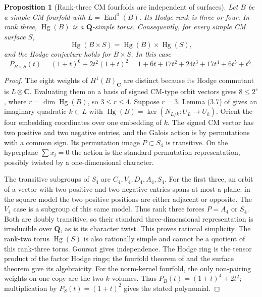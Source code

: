 \documentclass[11pt,reqno]{article}
\theoremstyle{emphasizedplain}
\newtheorem{proposition}[theorem]{Proposition}
\theoremstyle{emphasizeddefinition}
\theoremstyle{emphasizeddefinition}
\DeclareMathOperator{\End}{End}
\DeclareMathOperator{\Hg}{Hg}
\newcommand{\Q}{\mathbf Q}
\newcommand{\C}{\mathbf C}
\begin{document}
\begin{proposition}[Rank-three CM fourfolds are independent of surfaces]
\label{p:N2CMrankthree}
Let $B$ be a simple CM fourfold with $L=\End^0(B)$.
Its Hodge rank is three or four. In rank three, $\Hg(B)$ is a
$\Q$-simple torus. Consequently, for every simple CM surface $S$,
\[
 \Hg(B\times S)=\Hg(B)\times\Hg(S),
\]
and the Hodge conjecture holds for $B\times S$. In this case
\[
 P_{B\times S}(t)=(1+t)^6+2t^2(1+t)^2
 =1+6t+17t^2+24t^3+17t^4+6t^5+t^6.
\]
\end{proposition}
\begin{proof}
The eight weights of $H^1(B)_\C$ are distinct because its Hodge
commutant is $L\otimes\C$. Evaluating them on a basis of signed
CM-type orbit vectors gives $8\leq2^r$, where $r=\dim\Hg(B)$,
so $3\leq r\leq4$.
Suppose $r=3$. Lemma (3.7) of \cite{MZ} gives an imaginary
quadratic $k\subset L$ with $\Hg(B)=\ker(N_{L/k}:U_L\to U_k)$.
Orient the four embedding coordinates over one embedding of $k$.
The signed CM vector has two positive and two negative entries,
and the Galois action is by permutations with a common sign.
Its permutation image $P\subset S_4$ is transitive. On the
hyperplane $\sum x_i=0$ the action is the standard permutation
representation, possibly twisted by a one-dimensional character.

The transitive subgroups of $S_4$ are $C_4,V_4,D_4,A_4,S_4$.
For the first three, an orbit of a vector with two positive and
two negative entries spans at most a plane: in the square model
the two positive positions are either adjacent or opposite.
The $V_4$ case is a subgroup of this same model. Thus rank three
forces $P=A_4$ or $S_4$. Both are doubly transitive, so their
standard three-dimensional representation is irreducible over
$\Q$, as is its character twist. This proves rational simplicity.
The rank-two torus $\Hg(S)$ is also rationally simple and cannot
be a quotient of this rank-three torus. Goursat gives independence.
The Hodge ring is the tensor product of the factor Hodge rings;
the fourfold theorem of \cite{Markman} and the surface theorem
give its algebraicity.
For the norm-kernel fourfold, the only non-pairing weights on one
copy are the two $k$-volumes. Thus $P_B(t)=(1+t)^4+2t^2$;
multiplication by $P_S(t)=(1+t)^2$ gives the stated polynomial.
\end{proof}
\end{document}
